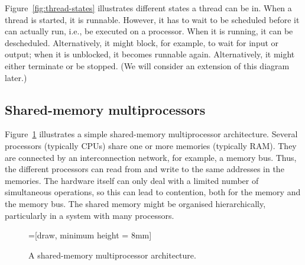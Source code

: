 
Figure~\ref{fig:thread-states} illustrates different states a thread can be
in.  When a thread is started, it is runnable.  However, it has to wait to be
scheduled before it can actually run, i.e., be executed on a processor.  When
it is running, it can be descheduled.  Alternatively, it might block, for
example, to wait for input or output; when it is unblocked, it becomes
runnable again.  Alternatively, it might either terminate or be stopped.  (We
will consider an extension of this diagram later.)


\subsection{Shared-memory multiprocessors}

Figure~\ref{fig:multi-arch} illustrates a simple shared-memory multiprocessor
architecture.  Several processors (typically CPUs) share one or more memories
(typically RAM).  They are connected by an interconnection network, for
example, a memory bus.  Thus, the different processors can read from and write
to the same addresses in the memories.  The hardware itself can only deal with
a limited number of simultaneous operations, so this can lead to contention,
both for the memory and the memory bus.  The shared memory might be organised
hierarchically, particularly in a system with many processors.


\begin{figure}
=[draw, minimum height = 8mm]
\begin{center}
\end{center}
\caption{A shared-memory multiprocessor architecture.}
\label{fig:multi-arch}
\end{figure}


